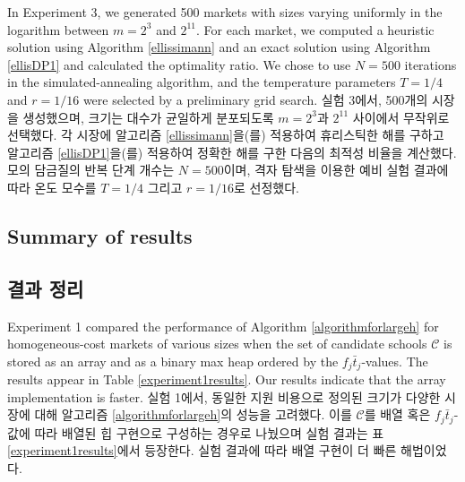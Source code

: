\documentclass[11pt]{article} %
\theoremstyle{definition}
\theoremstyle{definition}
\begin{document}
\ifen
In Experiment 3, we generated 500 markets with sizes varying uniformly in the logarithm between $m = 2^3$ and $2^{11}$. For each market, we computed a heuristic solution using Algorithm \ref{ellissimann} and an exact solution using Algorithm \ref{ellisDP1} and calculated the optimality ratio. We chose to use $N = 500$ iterations in the simulated-annealing algorithm, and the temperature parameters $T = 1/4$ and $r = 1/16$ were selected by a preliminary grid search.  
\else
실험 3에서, 500개의 시장을 생성했으며, 크기는 대수가 균일하게 분포되도록 $m = 2^3$과 $2^{11}$ 사이에서 무작위로 선택했다. 각 시장에 알고리즘 \ref{ellissimann}을(를) 적용하여 휴리스틱한 해를 구하고 알고리즘 \ref{ellisDP1}을(를) 적용하여 정확한 해를 구한 다음의 최적성 비율을 계산했다. 모의 담금질의 반복 단계 개수는 $N = 500$이며, 격자 탐색을 이용한 예비 실험 결과에 따라 온도 모수를 $T = 1/4$ 그리고 $r = 1/16$로 선정했다.
\fi

\ifen \subsection{Summary of results} \else \subsection{결과 정리}\fi
\ifen
Experiment 1 compared the performance of Algorithm \ref{algorithmforlargeh} for homogeneous-cost markets of various sizes when the set of candidate schools $\mathcal{C}$ is stored as an array and as a binary max heap ordered by the $f_j \bar t_j$-values. The results appear in Table \ref{experiment1results}. Our results indicate that the array implementation is faster. %
\else
실험 1에서, 동일한 지원 비용으로 정의된 크기가 다양한 시장에 대해 알고리즘 \ref{algorithmforlargeh}의 성능을 고려했다. 이를 $\mathcal{C}$를 배열 혹은 $f_j \bar t_j$-값에 따라 배열된 힙 구현으로 구성하는 경우로 나눴으며 실험 결과는 표 \ref{experiment1results}에서 등장한다. 실험 결과에 따라 배열 구현이 더 빠른 해법이었다. %
\fi
\end{document}
